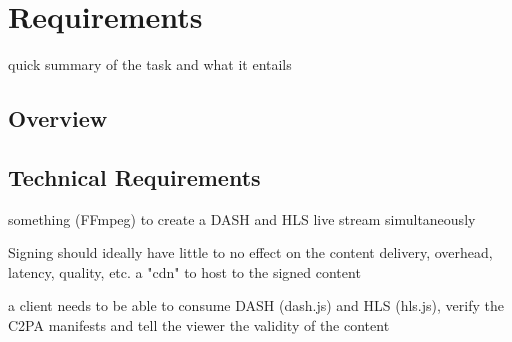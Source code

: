 \chapter{Requirements\label{cha:chapter3}}

quick summary of the task and what it entails

\section{Overview\label{sec:reqoverview}}



\section{Technical Requirements\label{sec:techreq}}

something (FFmpeg) to create a DASH and HLS live stream simultaneously

Signing should ideally have little to no effect on the content delivery, overhead, latency, quality, etc.
a "cdn" to host to the signed content

a client needs to be able to consume DASH (dash.js) and HLS (hls.js), verify the C2PA manifests and tell the viewer the validity of the content
